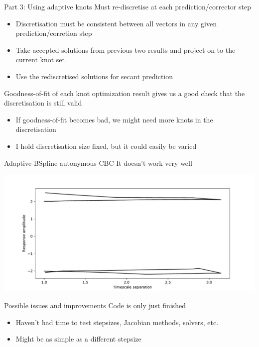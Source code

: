 \documentclass[presentation]{beamer}
\begin{document}
\begin{frame}[label={sec:org8b28410}]{Part 3: Using adaptive knots}
Must re-discretise at each prediction/corrector step
\vfill
\begin{itemize}
\item Discretisation must be consistent between all vectors in any given prediction/corretion step
\item Take accepted solutions from previous two results and project on to the current knot set
\item Use the rediscretised solutions for secant prediction
\end{itemize}
\vfill
Goodness-of-fit of each knot optimization result gives us a good check that the discretisation is still valid
\begin{itemize}
\item If goodness-of-fit becomes bad, we might need more knots in the discretisation
\item I hold discretisation size fixed, but it could easily be varied
\end{itemize}
\end{frame}

\begin{frame}[label={sec:orgfe217db}]{Adaptive-BSpline autonymous CBC}
It doesn't work very well

\begin{center}
\includegraphics[width=.9\linewidth]{./fail.pdf}
\end{center}
\end{frame}

\begin{frame}[label={sec:org130ae56}]{Possible issues and improvements}
Code is only just finished
\begin{itemize}
\item Haven't had time to test stepsizes, Jacobian methods, solvers, etc.
\item Might be as simple as a different stepsize
\end{itemize}
\end{frame}
\end{document}
